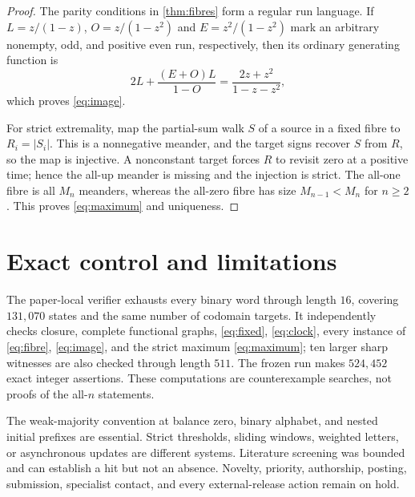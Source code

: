 \documentclass[10pt,a4paper]{amsart}
\theoremstyle{definition}
\theoremstyle{remark}
\begin{document}
\begin{proof}
The parity conditions in \cref{thm:fibres} form a regular run language.  If
$L=z/(1-z)$, $O=z/(1-z^2)$ and $E=z^2/(1-z^2)$ mark an arbitrary nonempty,
odd, and positive even run, respectively, then its ordinary generating
function is
\[
 2L+\frac{(E+O)L}{1-O}=\frac{2z+z^2}{1-z-z^2},
\]
which proves \eqref{eq:image}.

For strict extremality, map the partial-sum walk $S$ of a source in a fixed
fibre to $R_i=|S_i|$.  This is a nonnegative meander, and the target signs
recover $S$ from $R$, so the map is injective.  A nonconstant target forces
$R$ to revisit zero at a positive time; hence the all-up meander is missing
and the injection is strict.  The all-one fibre is all $M_n$ meanders,
whereas the all-zero fibre has size $M_{n-1}<M_n$ for $n\ge2$.  This proves
\eqref{eq:maximum} and uniqueness.
\end{proof}

\section{Exact control and limitations}

The paper-local verifier exhausts every binary word through length $16$,
covering $131{,}070$ states and the same number of codomain targets.  It
independently checks closure, complete functional graphs, \eqref{eq:fixed},
\eqref{eq:clock}, every instance of \eqref{eq:fibre}, \eqref{eq:image}, and
the strict maximum \eqref{eq:maximum}; ten larger sharp witnesses are also
checked through length $511$.  The frozen run makes $524{,}452$ exact
integer assertions.  These computations are counterexample searches, not
proofs of the all-$n$ statements.

The weak-majority convention at balance zero, binary alphabet, and nested
initial prefixes are essential.  Strict thresholds, sliding windows,
weighted letters, or asynchronous updates are different systems.  Literature
screening was bounded and can establish a hit but not an absence.  Novelty,
priority, authorship, posting, submission, specialist contact, and every
external-release action remain on hold.



\end{document}
